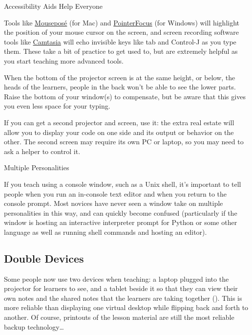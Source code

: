 \begin{callout}{Accessibility Aids Help Everyone}

  Tools like
  \href{https://boinx.com/mousepose/overview/}{Mousepos\'{e}} (for
  Mac) and \href{http://www.pointerfocus.com/}{PointerFocus} (for
  Windows) will highlight the position of your mouse cursor on the
  screen, and screen recording software tools like
  \href{https://www.techsmith.com/video-editor.html}{Camtasia} will
  echo invisible keys like tab and Control-J as you type them.  These
  take a bit of practice to get used to, but are extremely helpful as
  you start teaching more advanced tools.

\end{callout}

When the bottom of the projector screen is at the same height, or
below, the heads of the learners, people in the back won't be able to
see the lower parts. Raise the bottom of your window(s) to compensate,
but be aware that this gives you even less space for your typing.

If you can get a second projector and screen, use it: the extra real
estate will allow you to display your code on one side and its output
or behavior on the other. The second screen may require its own PC or
laptop, so you may need to ask a helper to control it.

\begin{callout}{Multiple Personalities}

  If you teach using a console window, such as a Unix shell, it's
  important to tell people when you run an in-console text editor and
  when you return to the console prompt. Most novices have never seen
  a window take on multiple personalities in this way, and can quickly
  become confused (particularly if the window is hosting an
  interactive interpreter prompt for Python or some other language as
  well as running shell commands and hosting an editor).

\end{callout}

\subsection*{Double Devices}

Some people now use two devices when teaching: a laptop plugged into
the projector for learners to see, and a tablet beside it so that they
can view their own notes and the shared notes that the learners are
taking together (). This is more
reliable than displaying one virtual desktop while flipping back and
forth to another.  Of course, printouts of the lesson material are
still the most reliable backup technology{\ldots}

